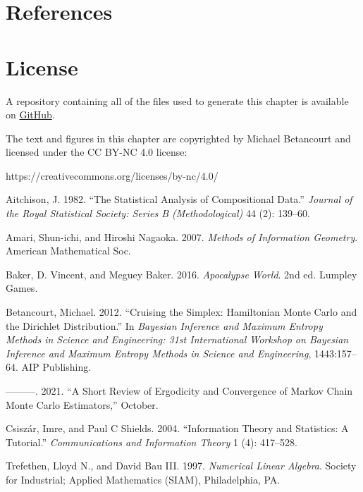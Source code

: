 \documentclass[
  letterpaper,
  DIV=11,
  numbers=noendperiod]{scrartcl}
\newlength{\cslhangindent}
\newenvironment{CSLReferences}[2] %
 {\begin{list}{}{%
  \setlength{\itemindent}{0pt}
  \setlength{\leftmargin}{0pt}
  \setlength{\parsep}{0pt}
  \ifodd #1
   \setlength{\leftmargin}{\cslhangindent}
   \setlength{\itemindent}{-1\cslhangindent}
  \fi
  \setlength{\itemsep}{#2\baselineskip}}}
 {\end{list}}
\begin{document}
\section*{References}\label{references}

\section*{License}\label{license}

A repository containing all of the files used to generate this chapter
is available on
\href{https://github.com/betanalpha/quarto_chapters/tree/main/case_studies/die_fairness}{GitHub}.

The text and figures in this chapter are copyrighted by Michael
Betancourt and licensed under the CC BY-NC 4.0 license:

https://creativecommons.org/licenses/by-nc/4.0/

\label{refs}
\begin{CSLReferences}{1}{0}
Aitchison, J. 1982. {``{The Statistical Analysis of Compositional
Data}.''} \emph{Journal of the Royal Statistical Society: Series B
(Methodological)} 44 (2): 139--60.

Amari, Shun-ichi, and Hiroshi Nagaoka. 2007. \emph{Methods of
Information Geometry}. American Mathematical Soc.

Baker, D. Vincent, and Meguey Baker. 2016. \emph{Apocalypse World}. 2nd
ed. Lumpley Games.

Betancourt, Michael. 2012. {``Cruising the Simplex: {H}amiltonian
{M}onte {C}arlo and the {D}irichlet Distribution.''} In \emph{Bayesian
Inference and Maximum Entropy Methods in Science and Engineering: 31st
International Workshop on Bayesian Inference and Maximum Entropy Methods
in Science and Engineering}, 1443:157--64. AIP Publishing.

---------. 2021. {``A Short Review of Ergodicity and Convergence of
Markov Chain Monte Carlo Estimators,''} October.

Csiszár, Imre, and Paul C Shields. 2004. {``Information Theory and
Statistics: {A} Tutorial.''} \emph{Communications and Information
Theory} 1 (4): 417--528.

Trefethen, Lloyd N., and David Bau III. 1997. \emph{Numerical Linear
Algebra}. Society for Industrial; Applied Mathematics (SIAM),
Philadelphia, PA.

\end{CSLReferences}
\end{document}
